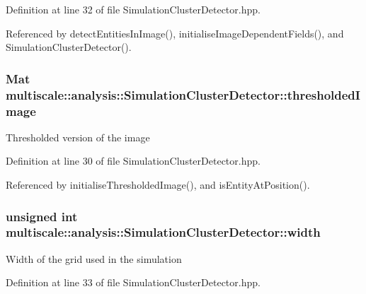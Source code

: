 Definition at line 32 of file Simulation\-Cluster\-Detector.\-hpp.



Referenced by detect\-Entities\-In\-Image(), initialise\-Image\-Dependent\-Fields(), and Simulation\-Cluster\-Detector().

\hypertarget{classmultiscale_1_1analysis_1_1SimulationClusterDetector_aca2aae9914ef643a543a834e61b1cccf}{
\subsubsection[{thresholded\-Image}]{\setlength{\rightskip}{0pt plus 5cm}Mat multiscale\-::analysis\-::\-Simulation\-Cluster\-Detector\-::thresholded\-Image\hspace{0.3cm}{\ttfamily [private]}}}\label{classmultiscale_1_1analysis_1_1SimulationClusterDetector_aca2aae9914ef643a543a834e61b1cccf}
Thresholded version of the image 

Definition at line 30 of file Simulation\-Cluster\-Detector.\-hpp.



Referenced by initialise\-Thresholded\-Image(), and is\-Entity\-At\-Position().

\hypertarget{classmultiscale_1_1analysis_1_1SimulationClusterDetector_a4c66a82aa1749dce31c767bc4008d904}{
\subsubsection[{width}]{\setlength{\rightskip}{0pt plus 5cm}unsigned int multiscale\-::analysis\-::\-Simulation\-Cluster\-Detector\-::width\hspace{0.3cm}{\ttfamily [private]}}}\label{classmultiscale_1_1analysis_1_1SimulationClusterDetector_a4c66a82aa1749dce31c767bc4008d904}
Width of the grid used in the simulation 

Definition at line 33 of file Simulation\-Cluster\-Detector.\-hpp.



